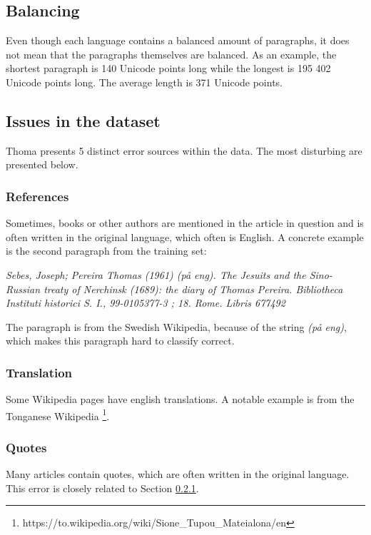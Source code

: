 \documentclass[conference]{IEEEtran}
\begin{document}
\subsection{Balancing}
Even though each language contains a balanced amount of paragraphs, it does not mean that the paragraphs themselves are balanced. As an example, the shortest paragraph is 140 Unicode points long while the longest is 195 402 Unicode points long. The average length is 371 Unicode points.

\subsection{Issues in the dataset}
Thoma presents 5 distinct error sources within the data. The most disturbing are presented below.

\subsubsection{References} \label{E1}
Sometimes, books or other authors are mentioned in the article in question and is often written in the original language, which often is English. A concrete example is the second paragraph from the training set:

\textit{Sebes, Joseph; Pereira Thomas (1961) (på eng). The Jesuits and the Sino-Russian treaty of Nerchinsk (1689): the diary of Thomas Pereira. Bibliotheca Instituti historici S. I., 99-0105377-3 ; 18. Rome. Libris 677492}

The paragraph is from the Swedish Wikipedia, because of the string \textit{(på eng)}, which makes this paragraph hard to classify correct.

\subsubsection{Translation} \label{E2}
Some Wikipedia pages have english translations. A notable example is from the Tonganese Wikipedia \footnote{https://to.wikipedia.org/wiki/Sione\_Tupou\_Mateialona/en}.

\subsubsection{Quotes} \label{E3}
Many articles contain quotes, which are often written in the original language. This error is closely related to Section \ref{E1}.

\end{document}
